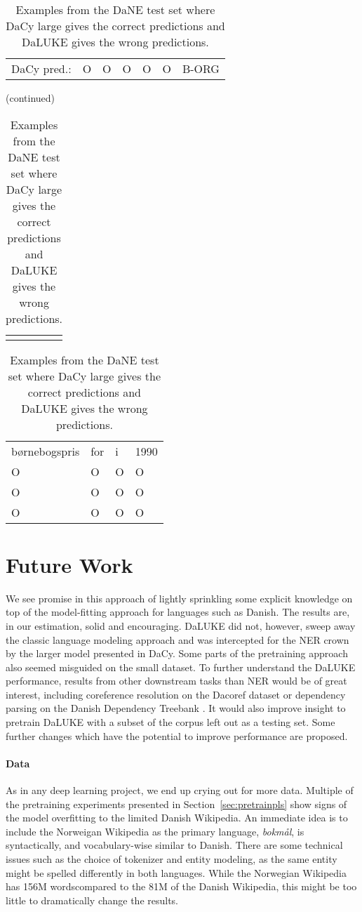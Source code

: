 \documentclass[main.tex]{subfiles}
\begin{document}
\begin{table}[H]
\begin{tabular}{l|llllll}
        DaCy pred.:   & O    & O       & O    & O  & O       & B-ORG
    \end{tabular}
    (continued)\\
    \begin{tabular}{c} %
        \quad \quad \quad \quad \quad \quad \quad \quad \quad \quad \quad
    \end{tabular}
    \begin{tabular}{llll}
        børnebogspris  & for  & i  & 1990  \\
        O              & O    & O  & O     \\\hline
        O              & O    & O  & O     \\
        O              & O    & O  & O
    \end{tabular}
    \caption{
        Examples from the DaNE test set where DaCy large gives the correct predictions and DaLUKE gives the wrong predictions.
    }
    \label{tab:dacyex}
\end{table}\noindent

\section{Future Work}
We see promise in this approach of lightly sprinkling some explicit knowledge on top of the model-fitting approach for languages such as Danish.
The results are, in our estimation, solid and encouraging.
DaLUKE did not, however, sweep away the classic language modeling approach and was intercepted for the NER crown by the larger model presented in DaCy.
Some parts of the pretraining approach also seemed misguided on the small dataset.
To further understand the DaLUKE performance, results from other downstream tasks than NER would be of great interest, including coreference resolution on the Dacoref dataset \cite{kromann2004cdt, danlp2021} or dependency parsing on the Danish Dependency Treebank \cite{kromann2003ddt}.
It would also improve insight to pretrain DaLUKE with a subset of the corpus left out as a testing set.
Some further changes which have the potential to improve performance are proposed.

\paragraph{Data}
As in any deep learning project, we end up crying out for more data.
Multiple of the pretraining experiments presented in Section~\ref{sec:pretrainpls} show signs of the model overfitting to the limited Danish Wikipedia.
An immediate idea is to include the Norweigan Wikipedia as the primary language, \emph{bokmål}, is syntactically, and vocabulary-wise similar to Danish.
There are some technical issues such as the choice of tokenizer and entity modeling, as the same entity might be spelled differently in both languages.
While the Norwegian Wikipedia has 156M words\footnotemark compared to the 81M of the Danish Wikipedia, this might be too little to dramatically change the results.
\end{document}
